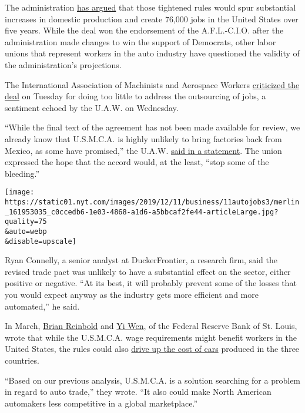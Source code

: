 The administration
\href{https://ustr.gov/about-us/policy-offices/press-office/press-releases/2019/april/usmca-estimated-support-76000}{has
argued} that those tightened rules would spur substantial increases in
domestic production and create 76,000 jobs in the United States over
five years. While the deal won the endorsement of the A.F.L.-C.I.O.
after the administration made changes to win the support of Democrats,
other labor unions that represent workers in the auto industry have
questioned the validity of the administration's projections.

The International Association of Machinists and Aerospace Workers
\href{https://www.goiam.org/news/imail/machinists-union-opposes-usmca/}{criticized
the deal} on Tuesday for doing too little to address the outsourcing of
jobs, a sentiment echoed by the U.A.W. on Wednesday.

``While the final text of the agreement has not been made available for
review, we already know that U.S.M.C.A. is highly unlikely to bring
factories back from Mexico, as some have promised,'' the U.A.W.
\href{https://uaw.org/statement-uaw-usmca/}{said in a statement}. The
union expressed the hope that the accord would, at the least, ``stop
some of the bleeding.''

\texttt{[image: https://static01.nyt.com/images/2019/12/11/business/11autojobs3/merlin\_161953035\_c0ccedb6-1e03-4868-a1d6-a5bbcaf2fe44-articleLarge.jpg?quality=75\\\&auto=webp\\\&disable=upscale]}

Ryan Connelly, a senior analyst at DuckerFrontier, a research firm, said
the revised trade pact was unlikely to have a substantial effect on the
sector, either positive or negative. ``At its best, it will probably
prevent some of the losses that you would expect anyway as the industry
gets more efficient and more automated,'' he said.

In March, \href{https://www.stlouisfed.org/authors/brian-reinbold}{Brian
Reinbold} and \href{https://www.stlouisfed.org/authors/yi-wen}{Yi Wen},
of the Federal Reserve Bank of St. Louis, wrote that while the
U.S.M.C.A. wage requirements might benefit workers in the United States,
the rules could also
\href{https://www.stlouisfed.org/publications/regional-economist/first-quarter-2019/changing-trade-relations-auto-exports}{drive
up the cost of cars} produced in the three countries.

``Based on our previous analysis, U.S.M.C.A. is a solution searching for
a problem in regard to auto trade,'' they wrote. ``It also could make
North American automakers less competitive in a global marketplace.''


